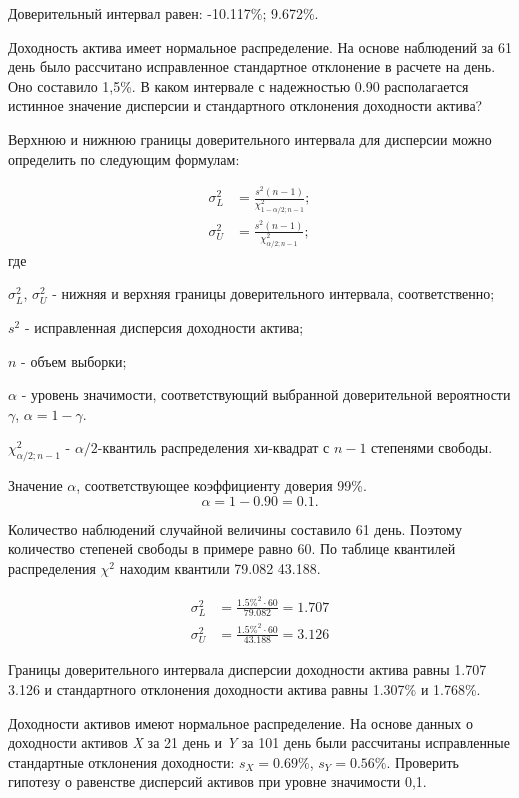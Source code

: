 \documentclass[12pt, table, twoside, a4paper]{exam}
\begin{document}
\begin{questions}
\begin{solution}[8em]
	Доверительный интервал равен: -10.117\%; 9.672\%.
	\end{solution}
	
	\pagebreak
	\question[10] Доходность актива имеет нормальное распределение. На основе наблюдений за 61 день было рассчитано исправленное стандартное отклонение в расчете на день. Оно составило 1,5\%. В каком интервале с надежностью 0.90 располагается истинное значение дисперсии и стандартного отклонения доходности актива?
	
	\begin{solution}[8em]
		\raggedright
		Верхнюю и нижнюю границы доверительного интервала для дисперсии можно определить по следующим формулам:
		
		\begin{align}
		\sigma_L^2&=\frac{s^2(n-1)}{\chi_{1-\alpha/2;n-1}^2};\\[8pt]
		\sigma_U^2&=\frac{s^2(n-1)}{\chi_{\alpha/2;n-1}^2};
		\end{align}
		где
		
		$\sigma_L^2$, $\sigma_U^2$ - нижняя и верхняя границы доверительного интервала, соответственно;
		
		$s^2$ - исправленная дисперсия доходности актива;
		
		$n$ - объем выборки;
		
		$\alpha$ - уровень значимости, соответствующий выбранной доверительной вероятности $\gamma$, $\alpha=1-\gamma$. 
		
		$\chi_{\alpha/2;n-1}^2$ - $\alpha/2$-квантиль распределения хи-квадрат с $n-1$ степенями свободы.
		
		Значение $\alpha$, соответствующее коэффициенту доверия 99\%.
		$$\alpha=1-0.90=0.1.$$
		
		Количество наблюдений случайной величины составило 61 день. Поэтому количество степеней свободы в примере равно 60. По таблице квантилей распределения $\chi^2$ находим квантили 79.082 43.188.
		
		\begin{align*}
			\sigma^2_L&=\frac{1.5\%^2 \cdot 60}{79.082}=1.707\\
			\sigma^2_U&=\frac{1.5\%^2 \cdot 60}{43.188}=3.126
		\end{align*}
		
		
		Границы доверительного интервала дисперсии доходности актива равны 1.707 3.126 и стандартного отклонения доходности актива равны 1.307\% и 1.768\%.
	\end{solution}
	
	\question[10] Доходности активов имеют нормальное распределение. На основе данных о доходности активов \textit{X} за 21 день и \textit{Y} за 101 день были рассчитаны исправленные стандартные отклонения доходности: $s_X=0.69\%$, $s_Y = 0.56\%$. Проверить гипотезу о равенстве дисперсий активов при уровне значимости 0,1.
	

\end{questions}
\end{document}
